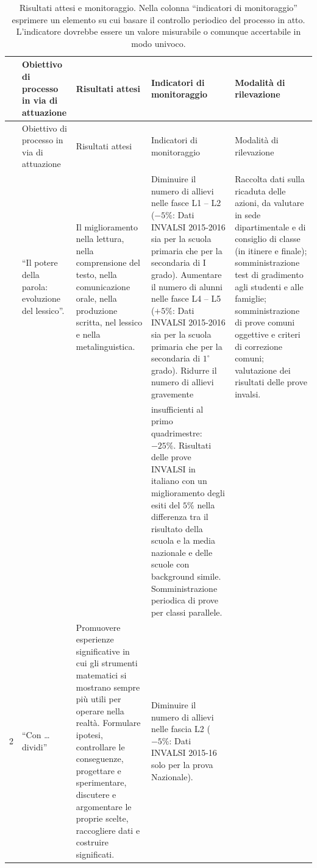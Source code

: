 \documentclass[12pt,a4paper,oneside]{memoir}
\begin{document}
\begin{footnotesize}
\captionsetup{width=13.5cm}
\begin{longtable}{|>{\raggedright}p{.342cm}|>{\raggedright}p{2.727cm}|>{\raggedright}p{2.727cm}|>{\raggedright}p{2.727cm}|>{\raggedright\arraybackslash}p{2.727cm}|}
\caption{Risultati attesi e  monitoraggio. Nella colonna ``indicatori di monitoraggio'' esprimere un elemento su cui basare il controllo periodico del processo in atto. L'indicatore dovrebbe essere un valore misurabile o comunque accertabile in modo univoco.} \label{risultati-e-monitoraggio}\\
\hline
\rowcolor{violetto}
&Obiettivo di processo in via di attuazione&Risultati attesi&Indicatori di monitoraggio&Modalità di rilevazione\\ \hline
\endfirsthead
\hline
\rowcolor{violetto}
&Obiettivo di processo in via di attuazione&Risultati attesi&Indicatori di monitoraggio&Modalità di rilevazione\\ \hline
\endhead
\hline \multicolumn{5}{r}{\emph{Continua nella pagina successiva}}
\endfoot
\hline
\endlastfoot
1&``Il potere della parola: evoluzione del lessico''.&Il miglioramento nella lettura, nella comprensione del testo, nella comunicazione orale, nella produzione scritta, nel lessico e nella metalinguistica.&Diminuire il numero di allievi nelle fasce L1 – L2 ($-5\%$: Dati INVALSI 2015-2016 sia per la scuola primaria che per la secondaria di I grado). 
Aumentare il numero di alunni nelle fasce L4 – L5 ($+5\%$: Dati INVALSI 2015-2016 sia per la scuola primaria che per la secondaria di $1^{\circ}$ grado).
Ridurre il numero di allievi gravemente&Raccolta dati sulla ricaduta delle azioni, da valutare in sede dipartimentale e di consiglio di classe (in itinere e finale);
somministrazione test di gradimento agli studenti e alle famiglie; somministrazione di prove comuni oggettive e criteri di correzione comuni; valutazione dei risultati delle prove invalsi.\\ \hline
&&&insufficienti al primo quadrimestre: $-25\%$.
Risultati delle prove INVALSI in italiano con un miglioramento degli esiti del $5\%$ nella differenza tra il risultato della scuola e la media nazionale e delle scuole con background simile. Somministrazione periodica di prove per classi parallele.&\\ \hline
2&``Con \ldots dividi''&Promuovere esperienze significative in cui gli strumenti matematici si mostrano sempre più utili per operare nella realtà.
Formulare ipotesi, controllare le conseguenze, progettare e sperimentare, discutere e argomentare le proprie scelte, raccogliere dati e costruire significati.&Diminuire il numero di allievi nelle fascia L2 ($-5\%$: Dati INVALSI 2015-16 solo per la prova Nazionale).

\end{longtable}
\end{footnotesize}
\end{document}
